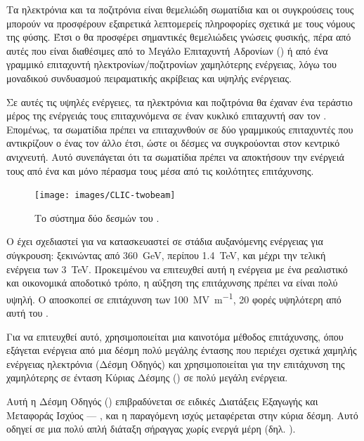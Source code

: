 Τα ηλεκτρόνια και τα ποζιτρόνια είναι θεμελιώδη σωματίδια και οι συγκρούσεις τους μπορούν να προσφέρουν εξαιρετικά λεπτομερείς πληροφορίες σχετικά με τους νόμους της φύσης. 
Έτσι ο  θα προσφέρει σημαντικές θεμελιώδεις γνώσεις φυσικής, πέρα από αυτές που είναι διαθέσιμες από το Μεγάλο Επιταχυντή Αδρονίων () ή από ένα γραμμικό επιταχυντή ηλεκτρονίων/ποζιτρονίων χαμηλότερης ενέργειας, λόγω του μοναδικού συνδυασμού πειραματικής ακρίβειας και υψηλής ενέργειας.

Σε αυτές τις υψηλές ενέργειες, τα ηλεκτρόνια και ποζιτρόνια θα έχαναν ένα τεράστιο μέρος της ενέργειάς τους επιταχυνόμενα σε έναν κυκλικό επιταχυντή σαν τον . 
Επομένως, τα σωματίδια πρέπει να επιταχυνθούν σε δύο γραμμικούς επιταχυντές που αντικρίζουν ο ένας τον άλλο έτσι, ώστε οι δέσμες να συγκρούονται στον κεντρικό ανιχνευτή. 
Αυτό συνεπάγεται ότι τα σωματίδια πρέπει να αποκτήσουν την ενέργειά τους από ένα και μόνο πέρασμα τους μέσα από τις κοιλότητες επιτάχυνσης.

\begin{figure}[tph]
\texttt{[image: images/CLIC-twobeam]}
\centering
\caption{Το σύστημα δύο δεσμών του .}
\label{img:CLICtwobeamscheme}
\end{figure}

Ο  έχει σχεδιαστεί για να κατασκευαστεί σε στάδια αυξανόμενης ενέργειας για σύγκρουση: ξεκινώντας από \SI{360}{\giga \electronvolt}, περίπου \SI{1.4}{\TeV}, και μέχρι την τελική ενέργεια των \SI{3}{\TeV}. 
Προκειμένου να επιτευχθεί αυτή η ενέργεια με ένα ρεαλιστικό και οικονομικά αποδοτικό τρόπο, η αύξηση της επιτάχυνσης πρέπει να είναι πολύ υψηλή.
Ο  αποσκοπεί σε επιτάχυνση των \SI[per-mode = symbol]{100}{\mega \volt \per \metre}, 20 φορές υψηλότερη από αυτή του .

Για να επιτευχθεί αυτό, χρησιμοποιείται μια καινοτόμα μέθοδος επιτάχυνσης, όπου εξάγεται ενέργεια από μια δέσμη πολύ μεγάλης έντασης που περιέχει σχετικά χαμηλής ενέργειας ηλεκτρόνια (Δέσμη Οδηγός) και χρησιμοποιείται για την επιτάχυνση της χαμηλότερης σε ένταση Κύριας Δέσμης () σε πολύ μεγάλη ενέργεια.

Αυτή η Δέσμη Οδηγός () επιβραδύνεται σε ειδικές Διατάξεις Εξαγωγής και Μεταφοράς Ισχύος --- , και η παραγόμενη  ισχύς μεταφέρεται στην κύρια δέσμη. 
Αυτό οδηγεί σε μια πολύ απλή διάταξη σήραγγας χωρίς ενεργά  μέρη (δηλ. ).

